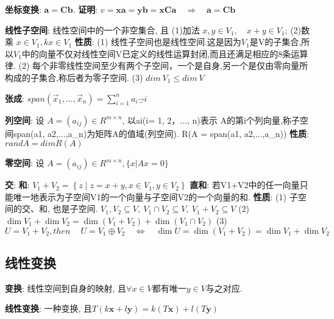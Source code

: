 \documentclass{article}
\begin{document}
            \textbf{坐标变换}: $\boldsymbol a = \boldsymbol C \boldsymbol b$.
                \textbf{证明}: $v = \boldsymbol x \boldsymbol a = \boldsymbol y \boldsymbol b = \boldsymbol x \boldsymbol C \boldsymbol a \quad \Rightarrow \quad \boldsymbol a = \boldsymbol C \boldsymbol b$

            
        \textbf{线性子空间}: 线性空间中的一个非空集合, 且 (1)加法 $x,y\in V_1 ,\quad x+y \in V_1$; (2)数乘 $x \in V_1, k x \in V_1$
            \textbf{性质}: 
                (1) 线性子空间也是线性空间.这是因为$V_1$是V的子集合,所以$V_1$中的向量不仅对线性空间V已定义的线性运算封闭,而且还满足相应的8条运算律.
                (2) 每个非零线性空间至少有两个子空间，一个是自身,另一个是仅由零向量所构成的子集合,称后者为零子空间.             
                (3) $dim\ V_1 \le dim\ V$

        \textbf{张成}: $span(\vec x_1,...,\vec x_n ) = {\sum_{i=1}^n a_i \vec_i}$ 
            
        \textbf{列空间}: 设 $A = (a_{ij})\in R^{m×n}$, 以ai(i= 1, 2，..., n)表示
        A的第i个列向量,称子空间span(a1, a2,...,a_n)为矩阵A的值域(列空间). R(A = span(a1, a2,...,a_n))
            \textbf{性质}: $rand A = dim R(A)$

        \textbf{零空间}: 设 $A = (a_{ij})\in R^{m×n}, \{x | Ax = 0\}$
        
        \textbf{交}: 
        \textbf{和}: $V_{1}+V_{2}=\left\{z \mid z=x+y, x \in V_{1}, y \in V_{2}\right\}$
        \textbf{直和}: 若V1+V2中的任一向量只能唯一地表示为子空间V1的一个向量与子空间V2的一个向量的和.
            \textbf{性质}: 
            (1) 子空间的交、和, 也是子空间. $V_1, V_2 \subseteq V,\ V_1 \cap V_2 \subseteq V,\ V_1 + V_2 \subseteq V$
            (2) $\operatorname{dim} V_{1}+\operatorname{dim} V_{2}=\operatorname{dim}\left(V_{1}+V_{2}\right)+\operatorname{dim}\left(V_{1} \cap V_{2}\right)$
            (3)  $U=V_{1} + V_{2}, then\ \quad U=V_{1} \oplus V_{2} \quad \Leftrightarrow \quad \operatorname{dim} U=\operatorname{dim}\left(V_{1}+V_{2}\right)=\operatorname{dim} V_{1}+\operatorname{dim} V_{2} $

        
    \subsection{线性变换}
        \textbf{变换}: 线性空间到自身的映射, 且$\forall x \in V$都有唯一$y \in V$与之对应.

        \textbf{线性变换}: 一种变换, 且$T(k \boldsymbol{x}+l \boldsymbol{y})=k(T \boldsymbol{x})+l(T \boldsymbol{y})$
\end{document}
